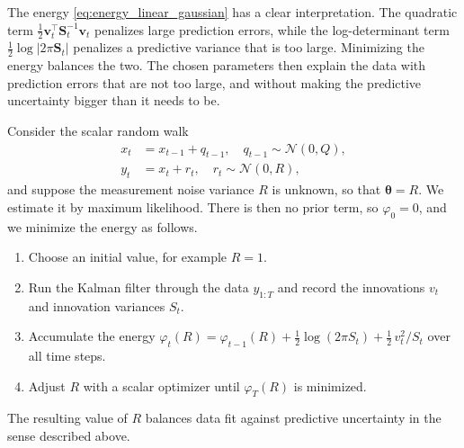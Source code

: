 The energy \eqref{eq:energy_linear_gaussian} has a clear interpretation. The quadratic term $\tfrac{1}{2}\mathbf{v}_t^\top \mathbf{S}_t^{-1}\mathbf{v}_t$ penalizes large prediction errors, while the log-determinant term $\tfrac{1}{2}\log|2\pi\mathbf{S}_t|$ penalizes a predictive variance that is too large. Minimizing the energy balances the two. The chosen parameters then explain the data with prediction errors that are not too large, and without making the predictive uncertainty bigger than it needs to be.

\begin{example}\label{ex:rw_param}
Consider the scalar random walk
\begin{align*}
    x_t &= x_{t-1} + q_{t-1}, \quad q_{t-1} \sim \mathcal{N}(0, Q), \\
    y_t &= x_t + r_t, \quad r_t \sim \mathcal{N}(0, R),
\end{align*}
and suppose the measurement noise variance $R$ is unknown, so that $\boldsymbol{\theta} = R$. We estimate it by maximum likelihood. There is then no prior term, so $\varphi_0 = 0$, and we minimize the energy as follows.
\begin{enumerate}
    \item Choose an initial value, for example $R = 1$.
    \item Run the Kalman filter through the data $y_{1:T}$ and record the innovations $v_t$ and innovation variances $S_t$.
    \item Accumulate the energy $\varphi_t(R) = \varphi_{t-1}(R) + \tfrac{1}{2}\log(2\pi S_t) + \tfrac{1}{2}\, v_t^2 / S_t$ over all time steps.
    \item Adjust $R$ with a scalar optimizer until $\varphi_T(R)$ is minimized.
\end{enumerate}
The resulting value of $R$ balances data fit against predictive uncertainty in the sense described above.
\end{example}

